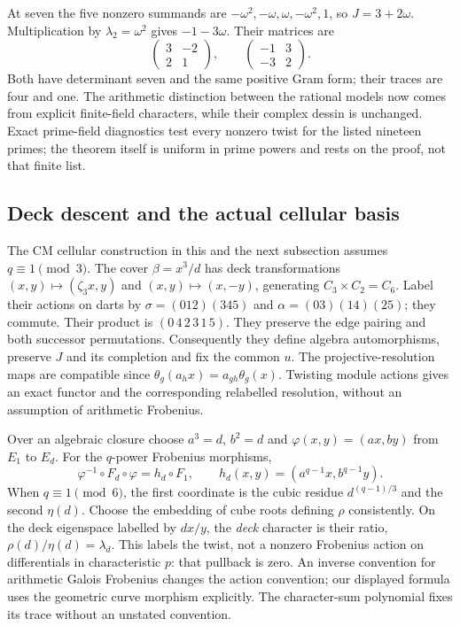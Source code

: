 \documentclass[11pt]{article}
\theoremstyle{definition}\newtheorem{definition}[theorem]{Definition}
\theoremstyle{remark}\newtheorem{remark}[theorem]{Remark}
\begin{document}
At seven the five nonzero summands are $-\omega^2,-\omega,\omega,-\omega^2,1$, so $J=3+2\omega$. Multiplication by $\lambda_2=\omega^2$ gives $-1-3\omega$. Their matrices are
\[
 \begin{pmatrix}3&-2\\2&1\end{pmatrix},\qquad
 \begin{pmatrix}-1&3\\-3&2\end{pmatrix}.
\]
Both have determinant seven and the same positive Gram form; their traces are four and one. The arithmetic distinction between the rational models now comes from explicit finite-field characters, while their complex dessin is unchanged. Exact prime-field diagnostics test every nonzero twist for the listed nineteen primes; the theorem itself is uniform in prime powers and rests on the proof, not that finite list.

\subsection{Deck descent and the actual cellular basis}
The CM cellular construction in this and the next subsection assumes $q\equiv1\pmod3$.
The cover $\beta=x^3/d$ has deck transformations $(x,y)\mapsto(\zeta_3x,y)$ and $(x,y)\mapsto(x,-y)$, generating $C_3\times C_2=C_6$. Label their actions on darts by $\sigma=(012)(345)$ and $\alpha=(03)(14)(25)$; they commute. Their product is $(0\,4\,2\,3\,1\,5)$. They preserve the edge pairing and both successor permutations. Consequently they define algebra automorphisms, preserve $J$ and its completion and fix the common $u$. The projective-resolution maps are compatible since $\theta_g(a_hx)=a_{gh}\theta_g(x)$. Twisting module actions gives an exact functor and the corresponding relabelled resolution, without an assumption of arithmetic Frobenius.

Over an algebraic closure choose $a^3=d$, $b^2=d$ and $\varphi(x,y)=(ax,by)$ from $E_1$ to $E_d$. For the $q$-power Frobenius morphisms,
\[
 \varphi^{-1}\circ F_d\circ\varphi=h_d\circ F_1,\qquad
 h_d(x,y)=(a^{q-1}x,b^{q-1}y).
\]
When $q\equiv1\pmod6$, the first coordinate is the cubic residue $d^{(q-1)/3}$ and the second $\eta(d)$. Choose the embedding of cube roots defining $\rho$ consistently. On the deck eigenspace labelled by $dx/y$, the \emph{deck} character is their ratio, $\rho(d)/\eta(d)=\lambda_d$. This labels the twist, not a nonzero Frobenius action on differentials in characteristic $p$: that pullback is zero. An inverse convention for arithmetic Galois Frobenius changes the action convention; our displayed formula uses the geometric curve morphism explicitly. The character-sum polynomial fixes its trace without an unstated convention.
\end{document}
